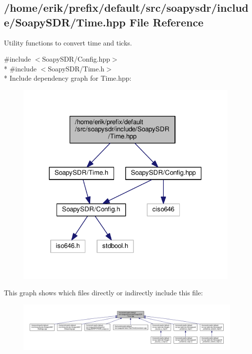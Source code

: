 \subsection{/home/erik/prefix/default/src/soapysdr/include/\+Soapy\+S\+D\+R/\+Time.hpp File Reference}
\label{Time_8hpp}


Utility functions to convert time and ticks.  


{\ttfamily \#include $<$Soapy\+S\+D\+R/\+Config.\+hpp$>$}\\*
{\ttfamily \#include $<$Soapy\+S\+D\+R/\+Time.\+h$>$}\\*
Include dependency graph for Time.\+hpp\+:
\nopagebreak
\begin{figure}[H]
\begin{center}
\leavevmode
\includegraphics[width=314pt]{dd/d16/Time_8hpp__incl}
\end{center}
\end{figure}
This graph shows which files directly or indirectly include this file\+:
\nopagebreak
\begin{figure}[H]
\begin{center}
\leavevmode
\includegraphics[width=350pt]{d6/d7c/Time_8hpp__dep__incl}
\end{center}
\end{figure}
